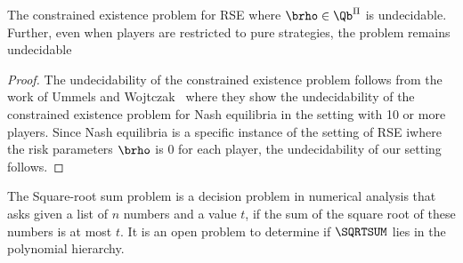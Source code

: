 \begin{proposition}\label{proposition:Undecidable}
    The constrained existence problem for RSE where $\brho \in \Qb^{\Pi}$ is undecidable. Further, even when players are restricted to pure strategies, the problem remains undecidable
\end{proposition}
\begin{proof}
         The undecidability of the constrained existence problem follows from the work of Ummels and Wojtczak~\cite[Theorem 4.9]{UW11} where they show the undecidability of the constrained existence problem for Nash equilibria in the setting with 10 or more players. Since Nash equilibria is a specific instance of the setting of RSE iwhere the risk parameters $\brho$ is $0$ for each player, the undecidability of our setting follows. 
\end{proof}

The Square-root sum problem is a decision problem in numerical analysis that asks given a list of $n$ numbers and a value $t$, if the sum of the square root of these numbers is at most $t$.
It is an open problem to determine if $\SQRTSUM$ lies in the polynomial hierarchy.  

